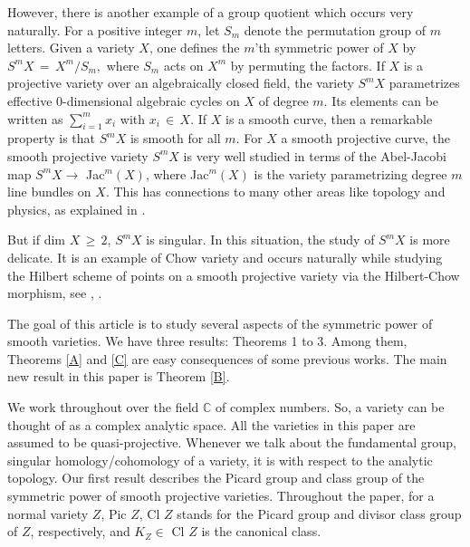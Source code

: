\documentclass[12pt,reqno]{amsart}
\theoremstyle{definition}
\numberwithin{equation}{section}
\begin{document}
However, there is another example of a group quotient which occurs very naturally. For a positive integer $m$, let $ S_m$ denote the permutation group of $m$ letters. Given a variety $X$, one defines the $m$'th symmetric power of $X$ by $S^mX\,=\,X^m/S_m,$ where $S_m$ acts on $X^m$ by permuting the factors. If $X$ is a projective variety over an algebraically closed field, the variety $S^mX$ parametrizes effective $0$-dimensional algebraic cycles on $X$ of degree $m$. Its elements can be written as $\sum_{i=1}^m x_i$ with $x_i\,\in\, X$. If $X$ is a smooth curve, then a remarkable property is that $S^mX$ is smooth for all $m$. For $X$ a smooth projective curve, the smooth projective variety $S^mX$ is very well studied in terms of the Abel-Jacobi map $S^mX\to$ Jac$^m(X)$, where Jac$^m(X)$ is the variety parametrizing degree $m$ line bundles on $X.$ This has connections to many other areas like topology and physics, as explained in \cite{BGZ}.

But if dim $X\,\geq\, 2$, $S^mX$ is singular. In this situation, the study of $S^mX$ is more delicate. It is an example of Chow variety and occurs naturally while studying the Hilbert scheme of points on a smooth projective variety via the Hilbert-Chow morphism, see \cite{fogarty1969truncated}, \cite{MFK}.

The goal of this article is to study several aspects of the symmetric power of smooth varieties. We have three results: Theorems 1 to 3. Among them, Theorems \ref{A} and \ref{C} are easy consequences of some previous works. The main new result in this paper is Theorem \ref{B}.

We work throughout over the field $\mathbb{C}$ of complex numbers. So, a variety can be thought of as a complex analytic space. All the varieties in this paper are assumed to be quasi-projective. Whenever we talk about the fundamental group, singular homology/cohomology of a variety, it is with respect to the analytic topology. Our first result describes the Picard group and class group of the symmetric power of smooth projective varieties. Throughout the paper, for a normal variety $Z$, Pic $Z$, Cl $Z$ stands for the Picard group and divisor class group of $Z$, respectively, and $K_Z\in$ Cl $Z$ is the canonical class.
\end{document}
